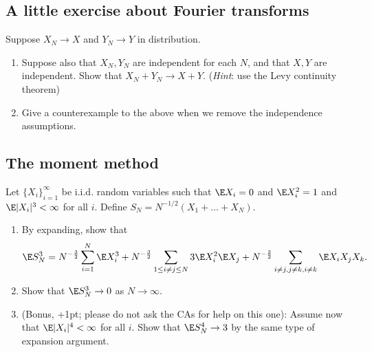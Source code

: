 \documentclass[12pt,reqno]{amsart}
\theoremstyle{definition}
\theoremstyle{remark}
\numberwithin{equation}{section}
\begin{document}
\subsection{A little exercise about Fourier transforms}
Suppose $X_{N}\to X$ and $Y_{N}\to Y$ in distribution. 
\begin{enumerate}
\item Suppose also that $X_{N},Y_{N}$ are independent for each $N$, and that $X,Y$ are independent. Show that $X_{N}+Y_{N}\to X+Y$. (\emph{Hint}: use the Levy continuity theorem)
\item Give a counterexample to the above when we remove the independence assumptions.
\end{enumerate}
\subsection{The moment method}
Let $\{X_{i}\}_{i=1}^{\infty}$ be i.i.d. random variables such that $\E X_{i}=0$ and $\E X_{i}^{2}=1$ and $\E |X_{i}|^{3}<\infty$ for all $i$. Define $S_{N}=N^{-1/2}(X_{1}+\ldots+X_{N})$.
\begin{enumerate}
\item By expanding, show that 
%
\begin{align*}
\E S_{N}^{3}=N^{-\frac32}\sum_{i=1}^{N}\E X_{i}^{3}+N^{-\frac32}\sum_{1\leq i\neq j\leq N}3\E X_{i}^{2}\E X_{j}+N^{-\frac32}\sum_{i\neq j, j\neq k, i\neq k}\E X_{i}X_{j}X_{k}.
\end{align*}
%
\item Show that $\E S_{N}^{3}\to0$ as $N\to\infty$.
\item (Bonus, +1pt; please do not ask the CAs for help on this one): Assume now that $\E|X_{i}|^{4}<\infty$ for all $i$. Show that $\E S_{N}^{4}\to3$ by the same type of expansion argument.
\end{enumerate}
\end{document}
